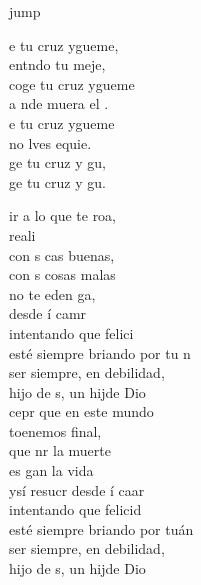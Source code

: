 \begin{cancion}jump\\
	\begin{chorus}%
		e tu cruz ygueme,  \\
		entndo tu meje, \\
		coge tu cruz ygueme  \\
		a nde muera el . \\
		e tu cruz ygueme  \\
		no lves equie. \\
		ge tu cruz y gu, \\
		ge tu cruz y gu. \jump\\
	\end{chorus}%
	\jump
	ir a lo que te roa, \\
	 reali \\
	con s cas buenas, \\
	con s cosas malas \\
	no te eden ga, \\
	desde í camr \\
	intentando que  felici \\
	esté siempre briando por tu n  \\
	 ser siempre, en debilidad, \\
	 hijo de s, un hijde Dio\\
	\jump
	cepr que en este mundo \\
	toenemos final, \\
	que nr la muerte \\
	es gan la vida  \\
	ysí resucr desde í caar\\
	intentando que  felicid\\
	esté siempre briando por tuán\\
	 ser siempre, en debilidad, \\
	 hijo de s, un hijde Dio\\
\end{cancion}%
